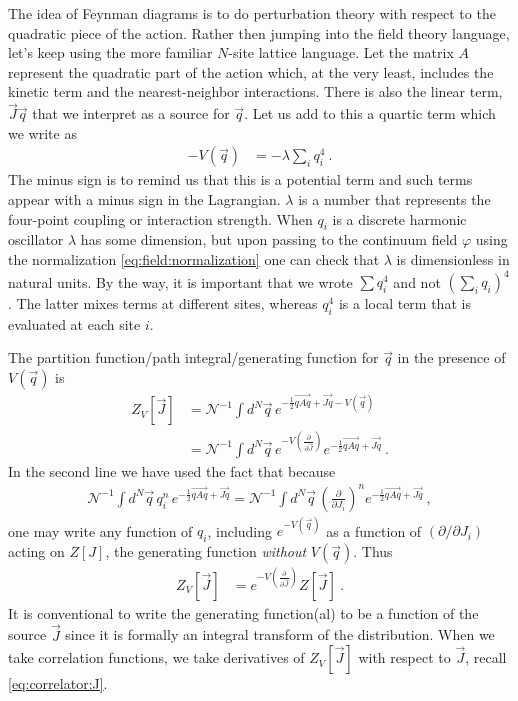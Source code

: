 The idea of Feynman diagrams is to do perturbation theory with respect to the quadratic piece of the action. Rather then jumping into the field theory language, let's keep using the more familiar $N$-site lattice language. Let the matrix $A$ represent the quadratic part of the action which, at the very least, includes the kinetic term and the nearest-neighbor interactions. There is also the linear term, $\vec{J}\vec{q}$ that we interpret as a source for $\vec{q}$. Let us add to this a quartic term which we write as
\begin{align}
 	-V(\vec{q}) &= - \lambda \sum_i q_i^4 \ .
 \end{align}
The minus sign is to remind us that this is a potential term and such terms appear with a minus sign in the Lagrangian. $\lambda$ is a number that represents the four-point coupling or interaction strength. When $q_i$ is a discrete harmonic oscillator $\lambda$ has some dimension, but upon passing to the continuum field $\varphi$ using the normalization \eqref{eq:field:normalization} one can check that $\lambda$ is dimensionless in natural units. By the way, it is important that we wrote $\sum q_i^4$ and not $(\sum_i q_i)^4$. The latter mixes terms at different sites, whereas $q_i^4$ is a local term that is evaluated at each site $i$. 

The partition function/path integral/generating function for $\vec{q}$ in the presence of $V(\vec{q})$ is
\begin{align}
	Z_V[\vec{J}] &= \mathcal N^{-1} \int d^N\vec{q} \, 
		e^{-\frac{1}{2} \vec{qAq} + \vec{Jq} - V(\vec{q})}
		\\
	&= 
	\mathcal N^{-1} \int d^N\vec{q} \, 
	e^{-V\left(\frac{\partial}{\partial \vec{J}}\right)}
		e^{-\frac{1}{2} \vec{qAq} + \vec{Jq}} \ .
\end{align}
In the second line we have used the fact that because
\begin{align}
	\mathcal N^{-1} \int d^N\vec{q} \, 
	q_i^n \, 
	e^{-\frac{1}{2} \vec{qAq} + \vec{Jq}}
	=
	\mathcal N^{-1} \int d^N\vec{q} \, 
	\left(\frac{\partial}{\partial J_i}\right)^n
	e^{-\frac{1}{2} \vec{qAq} + \vec{Jq}} \ ,
\end{align}
one may write any function of $q_i$, including $e^{-V(\vec{q})}$ as a function of $(\partial/\partial J_i)$ acting on $Z[J]$, the generating function \emph{without} $V(\vec{q})$. Thus
\begin{align}
	Z_V[\vec{J}] &= e^{-V\left(\frac{\partial}{\partial \vec{J}}\right)} Z[\vec{J}] \ .
	\label{eq:ZV:from:Z}
\end{align}
It is conventional to write the generating function(al) to be a function of the source $\vec{J}$ since it is formally an integral transform of the distribution. When we take correlation functions, we take derivatives of $Z_V[\vec{J}]$ with respect to $\vec{J}$, recall \eqref{eq:correlator:J}.

